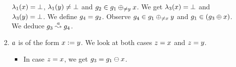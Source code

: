 \begin{enumerate}
\begin{enumerate}
  $\lambda_1(x)=\bot$, 
  $\lambda_1(y)\neq\bot$ and 
  $g_2\in g_1\oplus_{\neq{\ensuremath{y}}}{x}$.
  We get 
  $\lambda_3(x)=\bot$ and 
  $\lambda_3(y)=\bot$.
  We define $g_4=g_2$.
  Observe $g_4\in g_1\oplus_{\neq{\ensuremath{x}}}{y}$ and 
  $g_1\in\left(g_3\oplus{\ensuremath{x}}\right)$.
  We deduce $g_3\stackrel{a}{\leadsto}g_4$.
\item $a$ is of the form $x:=y$.
  We look at both cases $z=x$ and $z=y$.
  \begin{itemize}
  \item In case $z=x$, we get $g_3=g_1\ominus{\ensuremath{x}}$.


\end{itemize}
\end{enumerate}
\end{enumerate}
